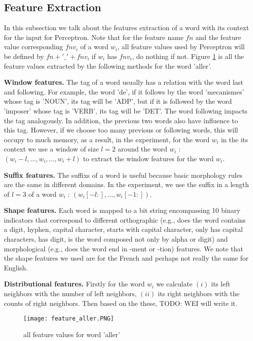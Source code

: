 \documentclass{article}
\begin{document}
\subsection{Feature Extraction}
In this subsection we talk about the features extraction of a word with its context for the input for Perceptron. Note that for the feature name $fn$ and  the feature value corresponding $fnv_i$ of a word $w_i$, all feature values used by Perceptron will be defined by $fn + '\_' + fnv_i$ if $w_i$ has $fnv_i$, do nothing if not. Figure \ref{figure1} is all the feature values extracted by the following methods for the word 'aller'.

\textbf{Window features.} The tag of a word usually has a relation with the word last and following. For example, the word 'de', if it follows by the word 'mecanismes' whose tag is 'NOUN', its tag will be 'ADP', but if it is followed by the word 'imposer' whose tag is 'VERB', its tag will be 'DET'. The word following impacts the tag analogously. In addition, the previous two words also have influence to this tag. However, if we choose too many previous or following words, this will occupy to much memory, as a result, in the experiment, for the word $w_i$ in the its context we use a window of size $l = 2$ around the word $w_i$ : $(w_i-l,\dots, w_i,\dots, w_i+l )$ to extract the window features for the word $w_i$.

\textbf{Suffix features.} The suffixs of a word is useful because basic morphology rules are the same in different domains. In the experiment, we use the suffix in a length of $l = 3$ of a word $w_i$ : $(w_i[-l:],\dots,w_i[-1:])$. 

\textbf{Shape features.} Each word is mapped to a bit string encompassing 10 binary indicators that correspond to different orthographic (e.g., does the word contains a digit, hyphen, capital character, starts with capital character, only has capital characters, has digit, is the word composed not only by alpha or digit) and morphological (e.g., does the word end in -ment or -tion) features. We note that the shape features we used are for the French and perhaps not really the same for English. 

\textbf{Distributional features.} Firstly for the word $w_i$ we calculate $(i)$ its left neighbors with the number of left neighbors, $(ii)$ its right neighbors with the counts of right neighbors. Then based on the these, TODO: WEI will write it.

\begin{figure}[ht]
\centering
\texttt{[image: feature\_aller.PNG]}
\caption{all feature values for word 'aller'}
\label{figure1}
\end{figure}
\end{document}
